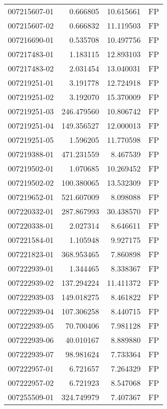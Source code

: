 \begin{tabular}{lrrl}
007215607-01 &    0.666805 &      10.615661 &   FP \\
007215607-02 &    0.666832 &      11.119503 &   FP \\
007216690-01 &    0.535708 &      10.497756 &   FP \\
007217483-01 &    1.183115 &      12.893103 &   FP \\
007217483-02 &    2.031454 &      13.040031 &   FP \\
007219251-01 &    3.191778 &      12.724918 &   FP \\
007219251-02 &    3.192070 &      15.370009 &   FP \\
007219251-03 &  246.479560 &      10.806742 &   FP \\
007219251-04 &  149.356527 &      12.000013 &   FP \\
007219251-05 &    1.596205 &      11.770598 &   FP \\
007219388-01 &  471.231559 &       8.467539 &   FP \\
007219502-01 &    1.070685 &      10.269452 &   FP \\
007219502-02 &  100.380065 &      13.532309 &   FP \\
007219652-01 &  521.607009 &       8.098088 &   FP \\
007220332-01 &  287.867993 &      30.438570 &   FP \\
007220338-01 &    2.027314 &       8.646611 &   FP \\
007221584-01 &    1.105948 &       9.927175 &   FP \\
007221823-01 &  368.953465 &       7.860898 &   FP \\
007222939-01 &    1.344465 &       8.338367 &   FP \\
007222939-02 &  137.294224 &      11.411372 &   FP \\
007222939-03 &  149.018275 &       8.461822 &   FP \\
007222939-04 &  107.306258 &       8.440715 &   FP \\
007222939-05 &   70.700406 &       7.981128 &   FP \\
007222939-06 &   40.010167 &       8.889880 &   FP \\
007222939-07 &   98.981624 &       7.733364 &   FP \\
007222957-01 &    6.721657 &       7.264329 &   FP \\
007222957-02 &    6.721923 &       8.547068 &   FP \\
007255509-01 &  324.749979 &       7.407367 &   FP \\

\end{tabular}
